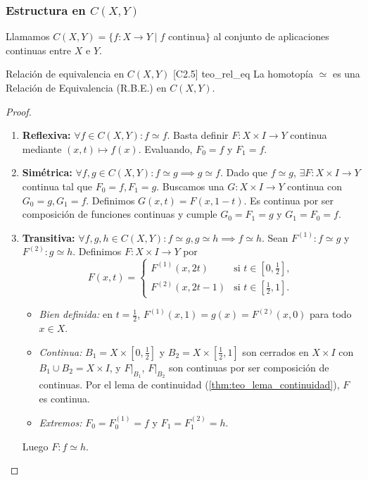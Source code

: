 \subsubsection{Estructura en $C(X,Y)$}

Llamamos $C(X,Y) = \{f \colon X \to Y \mid f \text{ continua}\}$ al conjunto de aplicaciones continuas entre $X$ e $Y$.

\begin{teorema}{Relación de equivalencia en $C(X,Y)$ [C2.5] \marcaT}{teo_rel_eq}
La homotopía $\simeq$ es una Relación de Equivalencia (R.B.E.) en $C(X,Y)$.
\end{teorema}

\begin{proof}
\begin{enumerate}
    \item \textbf{Reflexiva:} $\forall f \in C(X,Y) \colon f \simeq f$. Basta definir $F \colon X \times I \to Y$ continua mediante $(x,t) \mapsto f(x)$. Evaluando, $F_0 = f$ y $F_1 = f$.
    \item \textbf{Simétrica:} $\forall f,g \in C(X,Y) \colon f \simeq g \implies g \simeq f$.
    Dado que $f \simeq g$, $\exists F \colon X \times I \to Y$ continua tal que $F_0 = f, F_1 = g$.
    Buscamos una $G \colon X \times I \to Y$ continua con $G_0 = g, G_1 = f$.
    Definimos $G(x,t) = F(x, 1-t)$. Es continua por ser composición de funciones continuas y cumple $G_0 = F_1 = g$ y $G_1 = F_0 = f$.
    \item \textbf{Transitiva:} $\forall f,g,h \in C(X,Y) \colon f \simeq g, g \simeq h \implies f \simeq h$.
    Sean $F^{(1)} \colon f \simeq g$ y $F^{(2)} \colon g \simeq h$. Definimos $F \colon X \times I \to Y$ por
    \[ F(x,t) = \begin{cases} F^{(1)}(x, 2t) & \text{si } t \in \left[0, \frac{1}{2}\right], \\ F^{(2)}(x, 2t-1) & \text{si } t \in \left[\frac{1}{2}, 1\right]. \end{cases} \]
    \begin{itemize}
        \item \emph{Bien definida:} en $t = \frac12$, $F^{(1)}(x,1) = g(x) = F^{(2)}(x,0)$ para todo $x \in X$.
        \item \emph{Continua:} $B_1 = X \times [0,\frac12]$ y $B_2 = X \times [\frac12,1]$ son cerrados en $X \times I$ con $B_1 \cup B_2 = X \times I$, y $F|_{B_1}$, $F|_{B_2}$ son continuas por ser composición de continuas. Por el lema de continuidad (\cref{thm:teo_lema_continuidad}), $F$ es continua.
        \item \emph{Extremos:} $F_0 = F^{(1)}_0 = f$ y $F_1 = F^{(2)}_1 = h$.
    \end{itemize}
    Luego $F \colon f \simeq h$.
\end{enumerate}
\end{proof}

